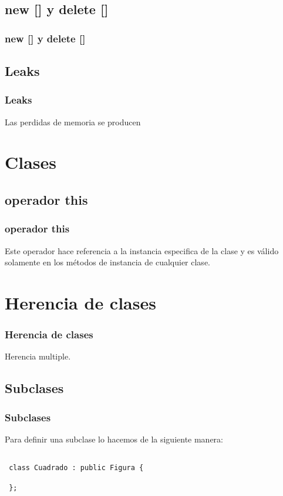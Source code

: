 \documentclass{beamer}
\begin{document}
\subsection{new [] y delete []}
\begin{frame}
\frametitle{new [] y delete []}

\end{frame}

\subsection{Leaks}
\begin{frame}
\frametitle{Leaks}

Las perdidas de memoria se producen 

\end{frame}

\section{Clases}

\subsection{operador this}
\begin{frame}
\frametitle{operador this}
  Este operador hace referencia a la instancia especifica de la clase y es válido solamente en los métodos de instancia de cualquier clase.

\end{frame}

\section{Herencia de clases}
\begin{frame}
\frametitle{Herencia de clases}
Herencia multiple.
\end{frame}

\subsection{Subclases}
\begin{frame}[fragile]
\frametitle{Subclases}

Para definir una subclase lo hacemos de la siguiente manera:

\begin{verbatim}

 class Cuadrado : public Figura {
 
 };
\end{verbatim}

\end{frame}
\end{document}
